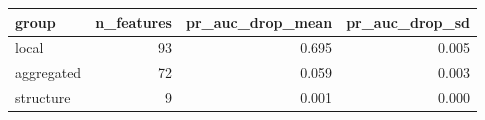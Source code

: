 \begin{tabular}{lrrr}
\toprule
group & n_features & pr_auc_drop_mean & pr_auc_drop_sd \\
\midrule
local & 93 & 0.695 & 0.005 \\
aggregated & 72 & 0.059 & 0.003 \\
structure & 9 & 0.001 & 0.000 \\
\bottomrule
\end{tabular}
